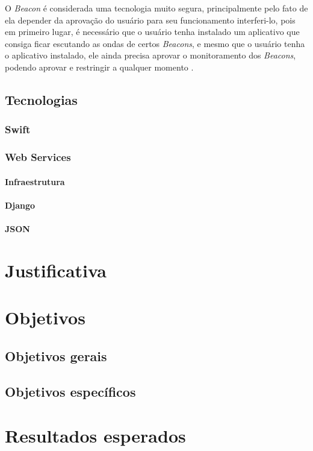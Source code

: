 \documentclass[
	12pt,
	oneside,
	a4paper,
	english,
	brazil,
]{abntex2}
\begin{document}
O \emph{Beacon} é considerada uma tecnologia muito segura, principalmente pelo fato de ela depender da aprovação do usuário para seu funcionamento interferi-lo, pois em primeiro lugar, é necessário que o usuário tenha instalado um aplicativo que consiga ficar escutando as ondas de certos \emph{Beacons}, e mesmo que o usuário tenha o aplicativo instalado, ele ainda precisa aprovar o monitoramento dos \emph{Beacons}, podendo aprovar e restringir a qualquer momento \cite{beacon-what-is-it-forbes}.

\section{Tecnologias}
\subsection{Swift}
\subsection{Web Services}
\subsubsection{Infraestrutura}
\subsubsection{Django}
\subsubsection{JSON}


\chapter{Justificativa}

\chapter{Objetivos}
\section{Objetivos gerais}
\section{Objetivos específicos}

\chapter{Resultados esperados}
\end{document}
